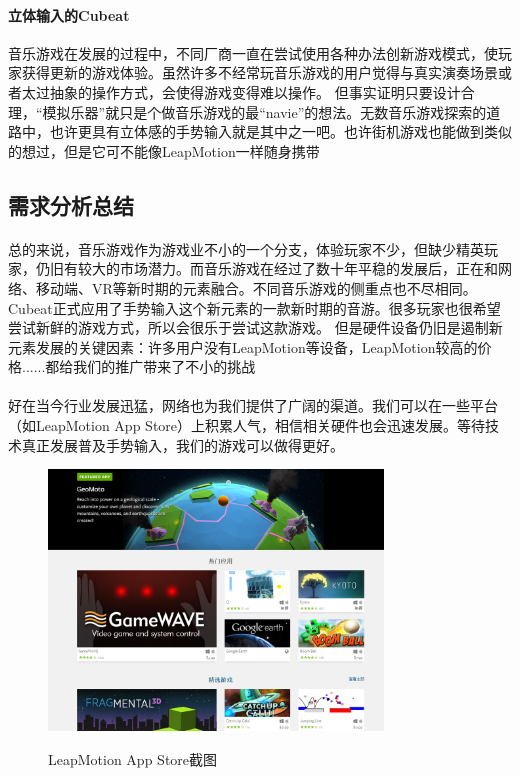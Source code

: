 \documentclass{article}
\begin{document}
\paragraph{立体输入的Cubeat}
音乐游戏在发展的过程中，不同厂商一直在尝试使用各种办法创新游戏模式，使玩家获得更新的游戏体验。虽然许多不经常玩音乐游戏的用户觉得与真实演奏场景或者太过抽象的操作方式，会使得游戏变得难以操作。
但事实证明只要设计合理，“模拟乐器”就只是个做音乐游戏的最“navie”的想法。无数音乐游戏探索的道路中，也许更具有立体感的手势输入就是其中之一吧。也许街机游戏也能做到类似的想过，但是它可不能像LeapMotion一样随身携带
\subsection{需求分析总结}
\paragraph{}
总的来说，音乐游戏作为游戏业不小的一个分支，体验玩家不少，但缺少精英玩家，仍旧有较大的市场潜力。而音乐游戏在经过了数十年平稳的发展后，正在和网络、移动端、VR等新时期的元素融合。不同音乐游戏的侧重点也不尽相同。
Cubeat正式应用了手势输入这个新元素的一款新时期的音游。很多玩家也很希望尝试新鲜的游戏方式，所以会很乐于尝试这款游戏。
但是硬件设备仍旧是遏制新元素发展的关键因素：许多用户没有LeapMotion等设备，LeapMotion较高的价格......都给我们的推广带来了不小的挑战
\paragraph{}
好在当今行业发展迅猛，网络也为我们提供了广阔的渠道。我们可以在一些平台（如LeapMotion App Store）上积累人气，相信相关硬件也会迅速发展。等待技术真正发展普及手势输入，我们的游戏可以做得更好。
\begin{figure}[H]
  \centering
  \includegraphics[width=24em]{leapMotionAppStore.png}\\
  \caption{LeapMotion App Store截图}\label{3-5}
\end{figure}
\newpage
\end{document}
